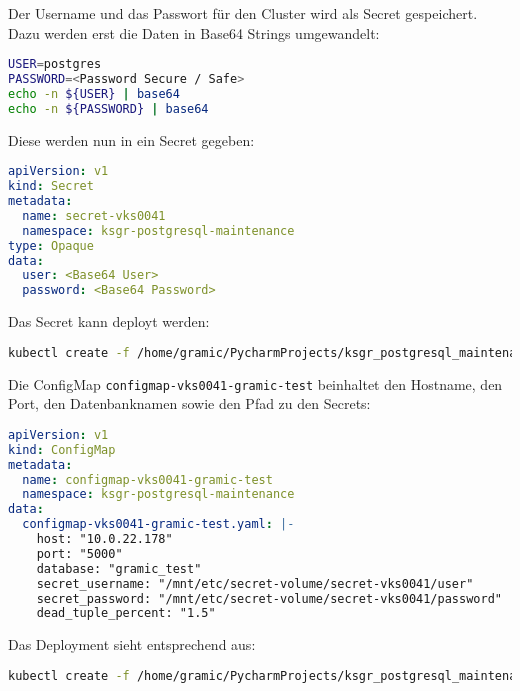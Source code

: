 \begin{flushleft}
    Der Username und das Passwort für den Cluster wird als Secret gespeichert.\\
    Dazu werden erst die Daten in Base64 Strings umgewandelt:
    \lstset{style=gra_codestyle}
    \begin{lstlisting}[language=bash, caption=Maintenance-Tool - Bloated Tables / Indices - Base64,captionpos=b,label={lst:maintenannce-tool-bloated-tables-base64},breaklines=true]
USER=postgres
PASSWORD=<Password Secure / Safe>
echo -n ${USER} | base64
echo -n ${PASSWORD} | base64
    \end{lstlisting}
    Diese werden nun in ein Secret gegeben:
    \lstset{style=gra_codestyle}
    \begin{lstlisting}[language=yaml, caption=Maintenance-Tool - Bloated Tables / Indices - Secret,captionpos=b,label={lst:maintenannce-tool-bloated-tables-secret},breaklines=true]
apiVersion: v1
kind: Secret
metadata:
  name: secret-vks0041
  namespace: ksgr-postgresql-maintenance
type: Opaque
data:
  user: <Base64 User>
  password: <Base64 Password>
    \end{lstlisting}
    Das Secret kann deployt werden:
    \lstset{style=gra_codestyle}
    \begin{lstlisting}[language=bash, caption=Maintenance-Tool - Bloated Tables / Indices - Secret Deploy,captionpos=b,label={lst:maintenannce-tool-bloated-tables-secret-deploy},breaklines=true]
kubectl create -f /home/gramic/PycharmProjects/ksgr_postgresql_maintenance/secret_vks0041.yaml
    \end{lstlisting}
\end{flushleft}
\begin{flushleft}
    Die ConfigMap \texttt{configmap-vks0041-gramic-test} beinhaltet den Hostname, den Port, den Datenbanknamen sowie den Pfad zu den Secrets:
    \lstset{style=gra_codestyle}
    \begin{lstlisting}[language=yaml, caption=Maintenance-Tool - Bloated Tables / Indices - configmap-vks0041-gramic-test,captionpos=b,label={lst:maintenannce-tool-bloated-tables-configmap-vks0041-gramic-test},breaklines=true]
apiVersion: v1
kind: ConfigMap
metadata:
  name: configmap-vks0041-gramic-test
  namespace: ksgr-postgresql-maintenance
data:
  configmap-vks0041-gramic-test.yaml: |-
    host: "10.0.22.178"
    port: "5000"
    database: "gramic_test"
    secret_username: "/mnt/etc/secret-volume/secret-vks0041/user"
    secret_password: "/mnt/etc/secret-volume/secret-vks0041/password"
    dead_tuple_percent: "1.5"
    \end{lstlisting}
    Das Deployment sieht entsprechend aus:
    \lstset{style=gra_codestyle}
    \begin{lstlisting}[language=bash, caption=Maintenance-Tool - Bloated Tables / Indices - configmap-vks0041-gramic-test Deploy,captionpos=b,label={lst:maintenannce-tool-bloated-tables-configmap-vks0041-gramic-test-deploy},breaklines=true]
kubectl create -f /home/gramic/PycharmProjects/ksgr_postgresql_maintenance/cleaned/configmap-vks0041-gramic_test.yaml
    \end{lstlisting}
\end{flushleft}
